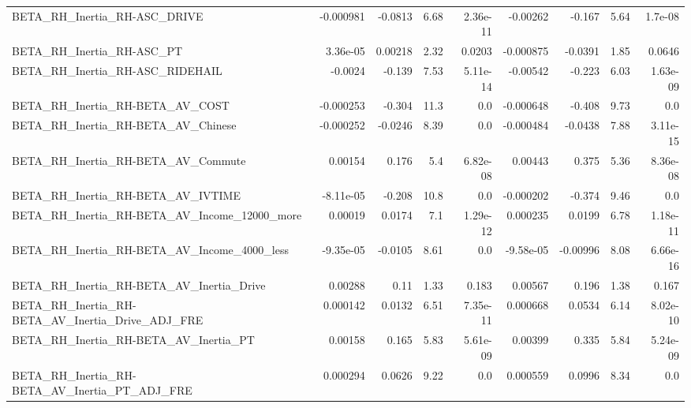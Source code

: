 \begin{tabular}{lrrrrrrrr}
BETA\_RH\_Inertia\_RH-ASC\_DRIVE                       &   -0.000981 &      -0.0813 &     6.68 & 2.36e-11 &   -0.00262 &      -0.167 &         5.64 &       1.7e-08 \\
BETA\_RH\_Inertia\_RH-ASC\_PT                          &    3.36e-05 &      0.00218 &     2.32 &   0.0203 &  -0.000875 &     -0.0391 &         1.85 &        0.0646 \\
BETA\_RH\_Inertia\_RH-ASC\_RIDEHAIL                    &     -0.0024 &       -0.139 &     7.53 & 5.11e-14 &   -0.00542 &      -0.223 &         6.03 &      1.63e-09 \\
BETA\_RH\_Inertia\_RH-BETA\_AV\_COST                    &   -0.000253 &       -0.304 &     11.3 &      0.0 &  -0.000648 &      -0.408 &         9.73 &           0.0 \\
BETA\_RH\_Inertia\_RH-BETA\_AV\_Chinese                 &   -0.000252 &      -0.0246 &     8.39 &      0.0 &  -0.000484 &     -0.0438 &         7.88 &      3.11e-15 \\
BETA\_RH\_Inertia\_RH-BETA\_AV\_Commute                 &     0.00154 &        0.176 &      5.4 & 6.82e-08 &    0.00443 &       0.375 &         5.36 &      8.36e-08 \\
BETA\_RH\_Inertia\_RH-BETA\_AV\_IVTIME                  &   -8.11e-05 &       -0.208 &     10.8 &      0.0 &  -0.000202 &      -0.374 &         9.46 &           0.0 \\
BETA\_RH\_Inertia\_RH-BETA\_AV\_Income\_12000\_more       &     0.00019 &       0.0174 &      7.1 & 1.29e-12 &   0.000235 &      0.0199 &         6.78 &      1.18e-11 \\
BETA\_RH\_Inertia\_RH-BETA\_AV\_Income\_4000\_less        &   -9.35e-05 &      -0.0105 &     8.61 &      0.0 &  -9.58e-05 &    -0.00996 &         8.08 &      6.66e-16 \\
BETA\_RH\_Inertia\_RH-BETA\_AV\_Inertia\_Drive           &     0.00288 &         0.11 &     1.33 &    0.183 &    0.00567 &       0.196 &         1.38 &         0.167 \\
BETA\_RH\_Inertia\_RH-BETA\_AV\_Inertia\_Drive\_ADJ\_FRE   &    0.000142 &       0.0132 &     6.51 & 7.35e-11 &   0.000668 &      0.0534 &         6.14 &      8.02e-10 \\
BETA\_RH\_Inertia\_RH-BETA\_AV\_Inertia\_PT              &     0.00158 &        0.165 &     5.83 & 5.61e-09 &    0.00399 &       0.335 &         5.84 &      5.24e-09 \\
BETA\_RH\_Inertia\_RH-BETA\_AV\_Inertia\_PT\_ADJ\_FRE      &    0.000294 &       0.0626 &     9.22 &      0.0 &   0.000559 &      0.0996 &         8.34 &           0.0 \\

\end{tabular}
